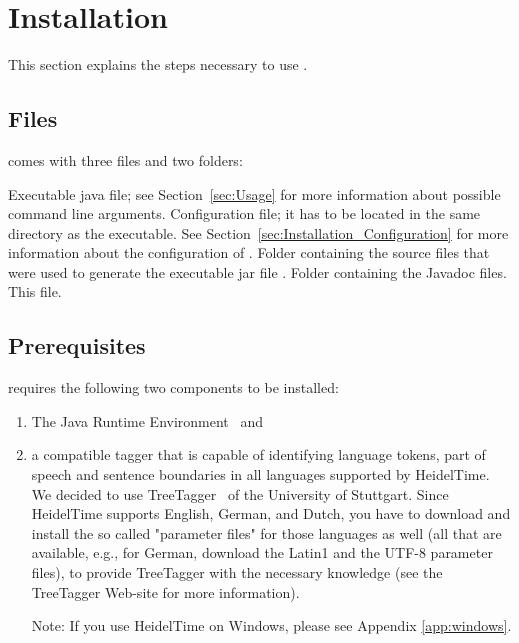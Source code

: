 \section{Installation}\label{sec:Installation}
This section explains the steps necessary to use \product{}.

\subsection{Files}\label{sec:Files}
\product{} comes with three files and two folders:
\begin{itemize}
\itemWithHead{\textnormal{\executableFile}}
Executable java file; see Section~\ref{sec:Usage} for more information about possible command line arguments.
\itemWithHead{\textnormal{\configFile}}
Configuration file; it has to be located in the same directory as the executable. See Section~\ref{sec:Installation_Configuration} for more information about the configuration of \product{}.
Folder containing the source files that were used to generate the executable jar file \executableFile.
Folder containing the Javadoc files.
\itemWithHead{\textnormal{\manualFile}}
This file.

\end{itemize}

\subsection{Prerequisites}\label{sec:Installation_Prerequisites}
\product{} requires the following two components to be installed:
\begin{enumerate}
\item The Java Runtime Environment~\cite{Java} and
\item a compatible tagger that is capable of identifying language tokens, part of speech and sentence boundaries in all languages supported by HeidelTime. We decided to use TreeTagger~\cite{TreeTagger} of the University of Stuttgart. Since HeidelTime supports English, German, and Dutch, you have to download and install the so called "parameter files" for those languages as well (all that are available, e.g., for German, download the Latin1 and the UTF-8 parameter files), to provide TreeTagger with the necessary knowledge (see the TreeTagger Web-site for more information).

Note: If you use HeidelTime on Windows, please see Appendix \ref{app:windows}.
\end{enumerate}

